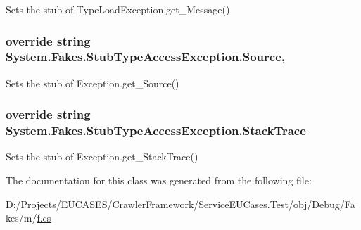 Sets the stub of Type\-Load\-Exception.\-get\-\_\-\-Message()

\hypertarget{class_system_1_1_fakes_1_1_stub_type_access_exception_adc066ac664f7eef130e218607a334d6e}{
\subsubsection[{Source}]{\setlength{\rightskip}{0pt plus 5cm}override string System.\-Fakes.\-Stub\-Type\-Access\-Exception.\-Source\hspace{0.3cm}{\ttfamily [get]}, {\ttfamily [set]}}}\label{class_system_1_1_fakes_1_1_stub_type_access_exception_adc066ac664f7eef130e218607a334d6e}


Sets the stub of Exception.\-get\-\_\-\-Source()

\hypertarget{class_system_1_1_fakes_1_1_stub_type_access_exception_ad1ba879ac05193c7233f139d0076c201}{
\subsubsection[{Stack\-Trace}]{\setlength{\rightskip}{0pt plus 5cm}override string System.\-Fakes.\-Stub\-Type\-Access\-Exception.\-Stack\-Trace\hspace{0.3cm}{\ttfamily [get]}}}\label{class_system_1_1_fakes_1_1_stub_type_access_exception_ad1ba879ac05193c7233f139d0076c201}


Sets the stub of Exception.\-get\-\_\-\-Stack\-Trace()



The documentation for this class was generated from the following file\-:\begin{DoxyCompactItemize}
\item 
D\-:/\-Projects/\-E\-U\-C\-A\-S\-E\-S/\-Crawler\-Framework/\-Service\-E\-U\-Cases.\-Test/obj/\-Debug/\-Fakes/m/\hyperlink{m_2f_8cs}{f.\-cs}\end{DoxyCompactItemize}
